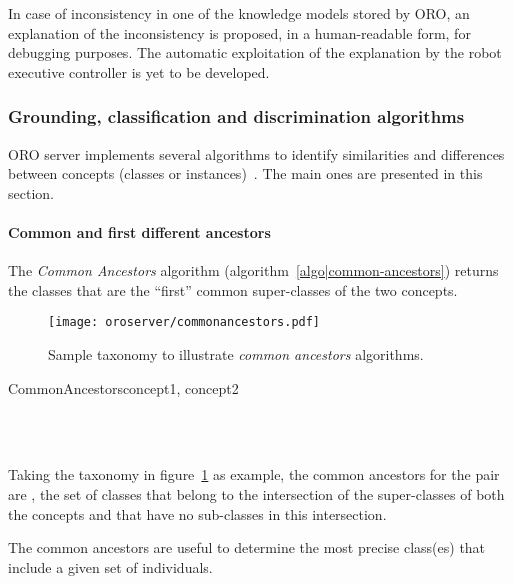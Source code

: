In case of inconsistency in one of the knowledge models stored by ORO, an explanation
of the inconsistency is proposed, in a human-readable form, for debugging
purposes. The automatic exploitation of the explanation by the robot executive
controller is yet to be developed.

\subsubsection{Grounding, classification and discrimination algorithms}
\label{sect|discrimination}

ORO server implements several algorithms to identify similarities and
differences between concepts (classes or instances)~\cite{Ros2010b}. The main
ones are presented in this section.

\paragraph{Common and first different ancestors} The \emph{Common Ancestors}
algorithm (algorithm~\ref{algo|common-ancestors}) returns the classes that
are the ``first'' common super-classes of the two concepts.

\begin{figure}
    \centering
    \texttt{[image: oroserver/commonancestors.pdf]}
    \caption{Sample taxonomy to illustrate \emph{common ancestors} algorithms.}
    \label{fig|common-ancestors}
\end{figure}

\small
\begin{pseudocode}[ruled]{CommonAncestors}{concept1, concept2}
\label{algo|common-ancestors}

\BEGIN
{} \GETS {} \cap {} \\
\\
\END

\end{pseudocode}
\normalsize

Taking the taxonomy in figure~\ref{fig|common-ancestors} as example, the common
ancestors for the pair  are
, \ie the set of classes that belong to
the intersection of the super-classes of both the concepts and that have no
sub-classes in this intersection.

The common ancestors are useful  to determine the most precise class(es) that
include a given set of individuals.

